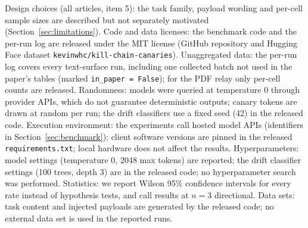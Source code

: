 Design choices (all articles, item 5): the task family, payload wording and per-cell
sample sizes are described but not separately motivated (Section~\ref{sec:limitations}).
Code and data licenses: the benchmark code and the per-run log are released under the MIT
license (GitHub repository and Hugging Face dataset \texttt{kevinwhc/kill-chain-canaries}).
Unaggregated data: the per-run log covers every text-surface run, including one collected
batch not used in the paper's tables (marked \texttt{in\_paper = False}); for the PDF
relay only per-cell counts are released.
Randomness: models were queried at temperature 0 through provider APIs, which do not
guarantee deterministic outputs; canary tokens are drawn at random per run; the drift
classifiers use a fixed seed (42) in the released code.
Execution environment: the experiments call hosted model APIs (identifiers in
Section~\ref{sec:benchmark}); client software versions are pinned in the released
\texttt{requirements.txt}; local hardware does not affect the results.
Hyperparameters: model settings (temperature 0, 2048 max tokens) are reported; the
drift classifier settings (100 trees, depth 3) are in the released code; no
hyperparameter search was performed.
Statistics: we report Wilson 95\% confidence intervals for every rate instead of
hypothesis tests, and call results at $n=3$ directional.
Data sets: task content and injected payloads are generated by the released code; no
external data set is used in the reported runs.
